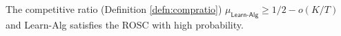\begin{theorem}\label{proof:learn1}
The competitive ratio (Definition \ref{defn:compratio})
  $\mu_{\textsf{Learn-Alg}} \ge 1/2-o(K/T)$ and \textsf{Learn-Alg} satisfies the ROSC with high probability. 
\end{theorem}
\vspace{-0.2in}


%
%


